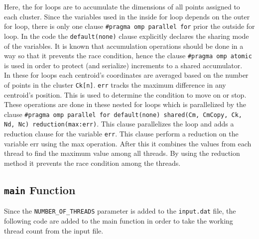 
Here, the for loops are to accumulate the dimensions of all points assigned to each cluster. Since the variables used in the inside for loop depends on the outer for loop, there is only one clause \texttt{\#pragma omp parallel for} prior the outside for loop. In the code the \texttt{default(none)} clause explicitly declares the sharing mode of the variables. It is known that accumulation operations should be done in a way so that it prevents the race condition, hence the clause \texttt{\#pragma omp atomic} is used in order to protect (and serialize) increments to a shared accumulator. \\


In these for loops each centroid's coordinates are averaged based on the number of points in the cluster \texttt{Ck[n]}. \texttt{err} tracks the maximum difference in any centroid's position. This is used to determine the condition to move on or stop. These operations are done in these nested for loops which is parallelized by the clause \texttt{\#pragma omp parallel for default(none) shared(Cm, CmCopy, Ck, Nd, Nc) reduction(max:err)}. This clause parallelizes the loop and adds a reduction clause for the variable \texttt{err}. This clause perform a reduction on the variable err using the max operation. After this it combines the values from each thread to find the maximum value among all threads. By using the reduction method it prevents the race condition among the threads.

\subsection{\texttt{main} Function}
Since the \texttt{NUMBER\_OF\_THREADS} parameter is added to the \texttt{input.dat} file, the following code are added to the main function in order to take the working thread count from the input file.

